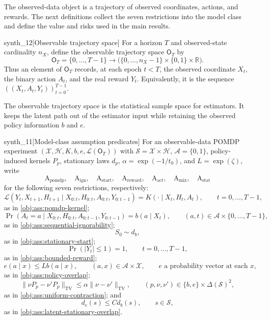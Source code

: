 The observed-data object is a trajectory of observed coordinates, actions, and rewards. The next definitions collect the seven restrictions into the model class and define the value and risks used in the main results.

\begin{definitionv}{synth_12}[Observable trajectory space]
For a horizon \(T\) and observed-state cardinality \(n_X\), define the observable trajectory space \(\mathsf O_T\) by
\[
\mathsf O_T
=
\{0,\ldots,T-1\}\to
\bigl(\{0,\ldots,n_X-1\}\times\{0,1\}\times\mathbb R\bigr).
\]
Thus an element of \(\mathsf O_T\) records, at each epoch \(t<T\), the observed coordinate \(X_t\), the binary action \(A_t\), and the real reward \(Y_t\). Equivalently, it is the sequence \(((X_t,A_t,Y_t))_{t=0}^{T-1}\).
\end{definitionv}

The observable trajectory space  is the statistical sample space for estimators. It keeps the latent path out of the estimator input while retaining the observed policy information \(b\) and \(e\).

\begin{definitionv}{synth_11}[Model-class assumption predicates]
For an observable-data POMDP experiment \((\mathcal X,\mathcal H,K,b,e,\mathcal L(\mathsf O_T))\) with \(\mathcal S=\mathcal X\times\mathcal H\), \(\mathcal A=\{0,1\}\), policy-induced kernels \(P_p\), stationary laws \(d_p\), \(\alpha=\exp(-1/t_0)\), and \(L=\exp(\zeta)\), write
\[
\mathrm A_{\mathrm{pomdp}},\quad
\mathrm A_{\mathrm{ign}},\quad
\mathrm A_{\mathrm{start}},\quad
\mathrm A_{\mathrm{reward}},\quad
\mathrm A_{\mathrm{act}},\quad
\mathrm A_{\mathrm{mix}},\quad
\mathrm A_{\mathrm{stat}}
\]
for the following seven restrictions, respectively:
\[
\mathcal L(Y_t,X_{t+1},H_{t+1}\mid X_{0:t},H_{0:t},A_{0:t},Y_{0:t-1})
=
K(\cdot\mid X_t,H_t,A_t),
\qquad t=0,\ldots,T-1,
\]
as in \cref{obj:ass:pomdp-kernel};
\[
\Pr(A_t=a\mid X_{0:t},H_{0:t},A_{0:t-1},Y_{0:t-1})
=
b(a\mid X_t),
\qquad (a,t)\in\mathcal A\times\{0,\ldots,T-1\},
\]
as in \cref{obj:ass:sequential-ignorability};
\[
S_0\sim d_b,
\]
as in \cref{obj:ass:stationary-start};
\[
\Pr(|Y_t|\le1)=1,
\qquad t=0,\ldots,T-1,
\]
as in \cref{obj:ass:bounded-reward};
\[
e(a\mid x)\le L b(a\mid x),
\qquad (a,x)\in\mathcal A\times\mathcal X,
\qquad e\text{ a probability vector at each }x,
\]
as in \cref{obj:ass:policy-overlap};
\[
\|\nu P_p-\nu'P_p\|_{\mathrm{TV}}
\le
\alpha\|\nu-\nu'\|_{\mathrm{TV}},
\qquad (p,\nu,\nu')\in\{b,e\}\times\Delta(\mathcal S)^2,
\]
as in \cref{obj:ass:uniform-contraction}; and
\[
d_e(s)\le C d_b(s),
\qquad s\in\mathcal S,
\]
as in \cref{obj:ass:latent-stationary-overlap}.
\end{definitionv}

